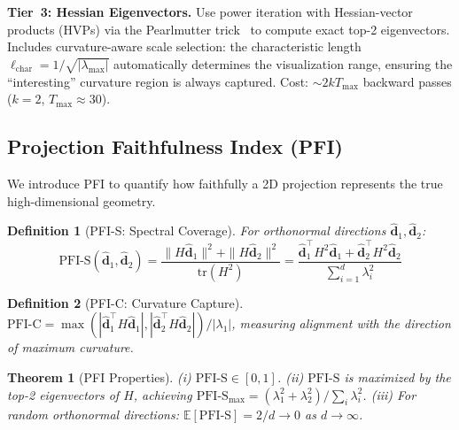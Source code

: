 \documentclass{article}
\newtheorem{theorem}{Theorem}
\newtheorem{definition}{Definition}
\begin{document}
\textbf{Tier~3: Hessian Eigenvectors.} Use power iteration with Hessian-vector products (HVPs) via the Pearlmutter trick~\citep{pearlmutter1994fast} to compute exact top-2 eigenvectors. Includes curvature-aware scale selection: the characteristic length $\ell_{\text{char}} = 1/\sqrt{|\lambda_{\max}|}$ automatically determines the visualization range, ensuring the ``interesting'' curvature region is always captured. Cost: $\sim 2kT_{\max}$ backward passes ($k=2$, $T_{\max} \approx 30$).

\subsection{Projection Faithfulness Index (PFI)}
\label{sec:pfi}

We introduce PFI to quantify how faithfully a 2D projection represents the true high-dimensional geometry.

\begin{definition}[PFI-S: Spectral Coverage]
\label{def:pfi_s}
For orthonormal directions $\hat{\mathbf{d}}_1, \hat{\mathbf{d}}_2$:
\begin{equation}
\mathrm{PFI\text{-}S}(\hat{\mathbf{d}}_1, \hat{\mathbf{d}}_2) = \frac{\|H \hat{\mathbf{d}}_1\|^2 + \|H \hat{\mathbf{d}}_2\|^2}{\mathrm{tr}(H^2)} = \frac{\hat{\mathbf{d}}_1^\top H^2 \hat{\mathbf{d}}_1 + \hat{\mathbf{d}}_2^\top H^2 \hat{\mathbf{d}}_2}{\sum_{i=1}^d \lambda_i^2}
\end{equation}
\end{definition}

\begin{definition}[PFI-C: Curvature Capture]
$\mathrm{PFI\text{-}C} = \max(|\hat{\mathbf{d}}_1^\top H \hat{\mathbf{d}}_1|, |\hat{\mathbf{d}}_2^\top H \hat{\mathbf{d}}_2|) / |\lambda_1|$, measuring alignment with the direction of maximum curvature.
\end{definition}

\begin{theorem}[PFI Properties]
\label{thm:pfi}
(i) $\mathrm{PFI\text{-}S} \in [0, 1]$. (ii) $\mathrm{PFI\text{-}S}$ is maximized by the top-2 eigenvectors of $H$, achieving $\mathrm{PFI\text{-}S}_{\max} = (\lambda_1^2 + \lambda_2^2) / \sum_i \lambda_i^2$. (iii) For random orthonormal directions: $\mathbb{E}[\mathrm{PFI\text{-}S}] = 2/d \to 0$ as $d \to \infty$.
\end{theorem}
\end{document}
